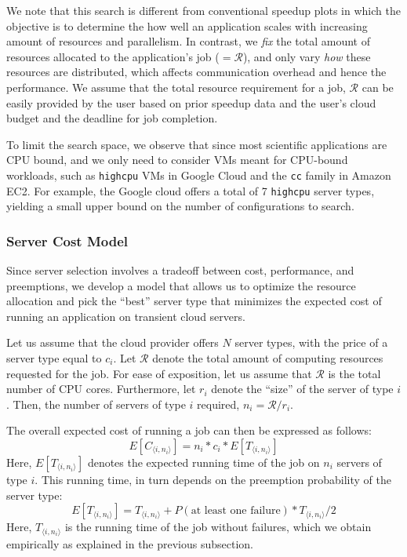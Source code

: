 We note that this search is different from conventional speedup plots in which the objective is to determine the how well an application scales with increasing amount of resources and parallelism. 
In contrast, we \emph{fix} the total amount of resources allocated to the application's job ($=\mathcal{R}$), and only vary \emph{how} these resources are distributed, which affects communication overhead and hence the performance.
We assume that the total resource requirement for a job, $\mathcal{R}$ can be easily provided by the user based on prior speedup data and the user's cloud budget and the deadline for job completion. 

To limit the search space, we observe that since most scientific applications are CPU bound, and we only need to consider VMs meant for CPU-bound workloads, such as \texttt{highcpu} VMs in Google Cloud and the \texttt{cc} family in Amazon EC2.
For example, the Google cloud offers a total of 7 \texttt{highcpu} server types, yielding a small upper bound on the number of configurations to search.


\subsubsection{Server Cost Model}

Since server selection involves a tradeoff between cost, performance, and preemptions, we develop a model that allows us to optimize the resource allocation and pick the ``best'' server type that minimizes the expected cost of running an application on transient cloud servers. 


Let us assume that the cloud provider offers $N$ server types, with the price of a server type equal to $c_i$. 
Let $\mathcal{R}$ denote the total amount of computing resources requested for the job. For ease of exposition, let us assume that $\mathcal{R}$ is the total number of CPU cores.
Furthermore, let $r_i$ denote the ``size'' of the server of type $i$.
Then, the number of servers of type $i$ required, $n_i = \mathcal{R}/r_i$. 

The overall expected cost of running a job can then be expressed as follows:
\begin{equation}
  \label{eq:e-cost}
  E[C_{\langle i,n_i \rangle}] = n_i*c_i * E[T_{\langle i,n_i \rangle}]
\end{equation}
Here, $E[T_{\langle i,n_i \rangle}]$ denotes the expected running time of the job on $n_i$ servers of type $i$.
This running time, in turn depends on the preemption probability of the server type:
\begin{equation}
  \label{eq:et1}
E[T_{\langle i,n_i \rangle}] = T_{\langle i,n_i \rangle} + P(\text{at least one failure})*T_{\langle i,n_i \rangle}/2   
\end{equation}
Here, $T_{\langle i,n_i \rangle}$ is the running time of the job without failures, which we obtain empirically as explained in the previous subsection.

